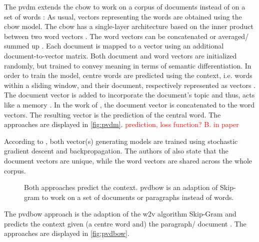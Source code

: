 The \ac{pvdm} extends the \ac{cbow} to work on a corpus of documents instead of on a set of words \cite{clusteringDocs2020}:
As usual, vectors representing the words are obtained using the \ac{cbow} model.
The \ac{cbow} has a single-layer architecture based on the inner product between two word vectors \cite{glove2014}.
The word vectors can be concatenated or averaged/ summed up \cite{SentRep2014}.
Each document is mapped to a vector using an additional document-to-vector matrix.
Both document and word vectors are initialized randomly, but trained to convey meaning in terms of semantic differentiation.
In order to train the model, centre words are predicted using the context, i.e. words within a sliding window, 
and their document, respectively represented as vectors \cite{SentRep2014}.
The document vector is added to incorporate the document's topic and thus, acts like a memory \cite{SentRep2014, Top2Vec2020}.
In the work of \cite{SentRep2014}, the document vector is concatenated to the word vectors.
The resulting vector is the prediction of the central word.
The approaches are displayed in \autoref{fig:pvdm}.
\textcolor{red}{prediction, loss function? B. in paper}

According to \cite{SentRep2014}, both vector(s) generating models are trained using stochastic gradient descent and backpropagation.
The authors of \cite{SentRep2014} also state that the document vectors are unique, while the word vectors are shared across the whole corpus. 

\begin{figure}%
    \centering
    \qquad
    \caption{Both approaches predict the context.
    \ac{pvdbow} is an adaption of Skip-gram to work on a set of documents or paragraphs instead of words.
    }%
    \label{fig:pvdbow}%
\end{figure}
The \ac{pvdbow} approach is the adaption of the \ac{w2v} algorithm Skip-Gram and predicts the context 
given (a centre word and) the paragraph/ document \cite{SentRep2014}.
The approaches are displayed in \autoref{fig:pvdbow}.


